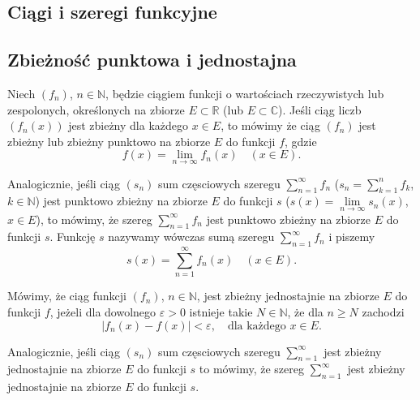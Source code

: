 \documentclass[leqno]{article}
\begin{document}
\begin{justify}

\section{Ciągi i szeregi funkcyjne}
\subsection{Zbieżność punktowa i jednostajna}

\begin{defn}
    Niech $(f_n)$, $n \in \mathbb{N}$, będzie ciągiem funkcji o wartościach rzeczywistych
    lub zespolonych, określonych na zbiorze $E \subset \mathbb{R}$ (lub $E \subset \mathbb
    {C}$). Jeśli ciąg liczb $(f_n(x))$ jest zbieżny dla każdego $x \in E$, to mówimy że
    ciąg $(f_n)$ jest zbieżny lub zbieżny punktowo na zbiorze $E$ do funkcji $f$, gdzie
    \[
        f(x) = \lim\limits_{n \to \infty}f_n(x) \quad (x \in E).
    \]

    Analogicznie, jeśli ciąg $(s_n)$ sum częsciowych szeregu 
    $\sum\limits_{n=1}^{\infty}f_n$ ($s_n = \sum\limits_{k=1}^{n}f_k$, $k \in \mathbb{N}$)
    jest punktowo zbieżny na zbiorze $E$ do funkcji 
    $s$ ($s(x) = \lim\limits_{n \to \infty} s_n(x)$, $x \in E$), to mówimy, że szereg
    $\sum\limits_{n=1}^{\infty}f_n$ jest punktowo zbieżny na zbiorze $E$ do funkcji $s$.
    Funkcję $s$ nazywamy wówczas sumą szeregu $\sum\limits_{n=1}^{\infty}f_n$ i piszemy
    \[
        s(x) = \sum\limits_{n=1}^{\infty}f_n(x) \quad (x \in E).
    \]
\end{defn}

\begin{defn}
    Mówimy, że ciąg funkcji $(f_n)$, $n \in \mathbb{N}$, jest zbieżny jednostajnie na
    zbiorze $E$ do funkcji $f$, jeżeli dla dowolnego $\varepsilon > 0$ istnieje takie $N
    \in \mathbb{N}$, że dla $n \geqslant N$ zachodzi
    \begin{equation}\label{eq:73}
        |f_n(x) - f(x)| < \varepsilon, \quad \text{dla każdego } x \in E.
    \end{equation}

    Analogicznie, jeśli ciąg $(s_n)$ sum częsciowych szeregu $\sum\limits_{n=1}^{\infty}$
    jest zbieżny jednostajnie na zbiorze $E$ do funkcji $s$ to mówimy, że szereg
    $\sum\limits_{n=1}^{\infty}$ jest zbieżny jednostajnie na zbiorze $E$ do funkcji $s$. 
\end{defn}


\end{justify}
\end{document}
